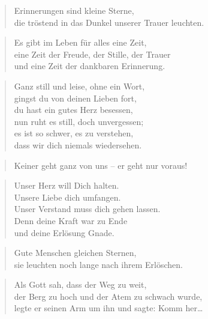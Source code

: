 \documentclass[ngerman,a4paper,11pt]{scrreprt}
\begin{document}
\begin{verse}
Erinnerungen sind kleine Sterne, \\
die tröstend in das Dunkel unserer Trauer leuchten. \\
\end{verse}

\begin{verse}
Es gibt im Leben für alles eine Zeit, \\
eine Zeit der Freude, der Stille, der Trauer \\
und eine Zeit der dankbaren Erinnerung. \\
\end{verse}

\begin{verse}
Ganz still und leise, ohne ein Wort, \\
gingst du von deinen Lieben fort, \\
du hast ein gutes Herz besessen, \\
nun ruht es still, doch unvergessen; \\
es ist so schwer, es zu verstehen, \\
dass wir dich niemals wiedersehen. \\
\end{verse}

\begin{verse}
Keiner geht ganz von uns -- er geht nur voraus! \\
\end{verse}

\begin{verse}
Unser Herz will Dich halten. \\
Unsere Liebe dich umfangen. \\
Unser Verstand muss dich gehen lassen. \\
Denn deine Kraft war zu Ende \\
und deine Erlösung Gnade. \\
\end{verse}

\begin{verse}
Gute Menschen gleichen Sternen, \\
sie leuchten noch lange nach ihrem Erlöschen. \\
\end{verse}

\begin{verse}
Als Gott sah, dass der Weg zu weit, \\
der Berg zu hoch und der Atem zu schwach wurde, \\
legte er seinen Arm um ihn und sagte: Komm her\ldots{} \\
\end{verse}
\end{document}
